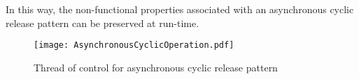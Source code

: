 In this way, the non-functional properties associated with an asynchronous cyclic release pattern can be preserved at run-time. 

\begin{figure}[h]
	\centering
	\texttt{[image: AsynchronousCyclicOperation.pdf]}
	\caption{Thread of control for asynchronous cyclic release pattern}
	\label{fig: Asynchronous cyclic}
\end{figure}  

   



 


 
